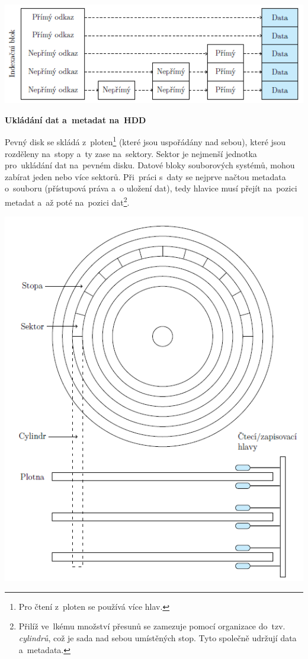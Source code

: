 \begin{center}
	\includegraphics[scale=1.2]{images/mem_block_index.png}
\end{center}

\begin{Large}
	\vspace{0,5cm}
	\textbf{Ukládání dat a~metadat na~HDD}
\end{Large}

Pevný disk se skládá z~ploten\footnote{Pro čtení z~ploten se používá více hlav.} (které jsou uspořádány nad sebou), které jsou rozděleny na~stopy a~ty zase na~sektory. Sektor je nejmenší jednotka pro~ukládání dat na~pevném disku. Datové bloky souborových systémů, mohou zabírat jeden nebo více sektorů. Při~práci s~daty se nejprve načtou metadata o~souboru (přístupová práva a~o uložení dat), tedy hlavice musí přejít na~pozici metadat a~až poté na~pozici dat\footnote{Přilíž ve~lkému množství přesunů se zamezuje pomocí organizace do~tzv. \emph{cylindrů}, což je sada nad sebou umístěných stop. Tyto společně udržují data a~metadata.}. 

\begin{center}
	\includegraphics[scale=1]{images/mem_hdd.png}
\end{center}

